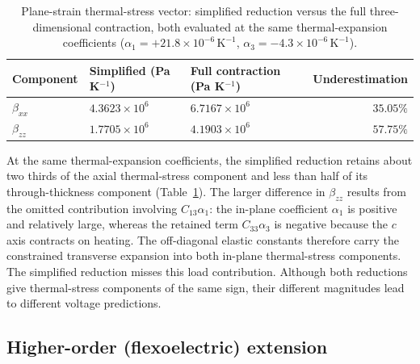 \documentclass[a4paper,12pt]{elsarticle}
\begin{document}
\begin{table}[t]
\centering
\caption{Plane-strain thermal-stress vector: simplified reduction versus the full
three-dimensional contraction, both evaluated at the same thermal-expansion
coefficients
($\alpha_1=+21.8\times10^{-6}\,\text{K}^{-1}$, $\alpha_3=-4.3\times10^{-6}\,\text{K}^{-1}$).}
\label{tab:beta}
\small
\begin{tabularx}{\linewidth}{@{}lXXr@{}}
\toprule
Component & Simplified (Pa K$^{-1}$) & Full contraction (Pa K$^{-1}$) & Underestimation \\
\midrule
$\beta_{xx}$ & $4.3623\times10^{6}$ & $6.7167\times10^{6}$ & $35.05\%$ \\
$\beta_{zz}$ & $1.7705\times10^{6}$ & $4.1903\times10^{6}$ & $57.75\%$ \\
\bottomrule
\end{tabularx}
\end{table}

At the same thermal-expansion coefficients, the simplified reduction
retains about two thirds of the axial thermal-stress component and less
than half of its through-thickness component (Table~\ref{tab:beta}). The larger
difference in $\beta_{zz}$ results from the omitted contribution involving
$C_{13}\alpha_1$: the in-plane coefficient $\alpha_1$ is positive and relatively large,
whereas the retained term $C_{33}\alpha_3$ is negative because the $c$ axis contracts
on heating. The off-diagonal elastic constants therefore carry the constrained
transverse expansion into both in-plane thermal-stress components.
The simplified reduction misses this load contribution. Although both
reductions give thermal-stress components of the same sign, their
different magnitudes lead to different voltage predictions.

\subsection{Higher-order (flexoelectric) extension}
\label{sec:flexo}
\end{document}
